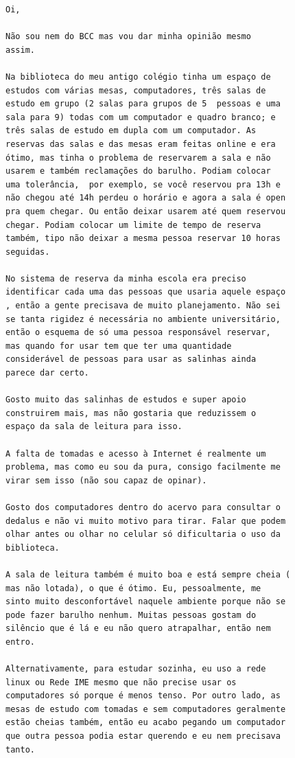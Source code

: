 \documentclass[titlepage]{article}
\begin{document}
\begin{lstlisting}[caption=Enviado por Aurea Hariki]
Oi,

Não sou nem do BCC mas vou dar minha opinião mesmo 
assim.

Na biblioteca do meu antigo colégio tinha um espaço de 
estudos com várias mesas, computadores, três salas de 
estudo em grupo (2 salas para grupos de 5  pessoas e uma 
sala para 9) todas com um computador e quadro branco; e 
três salas de estudo em dupla com um computador. As 
reservas das salas e das mesas eram feitas online e era 
ótimo, mas tinha o problema de reservarem a sala e não 
usarem e também reclamações do barulho. Podiam colocar 
uma tolerância,  por exemplo, se você reservou pra 13h e 
não chegou até 14h perdeu o horário e agora a sala é open 
pra quem chegar. Ou então deixar usarem até quem reservou 
chegar. Podiam colocar um limite de tempo de reserva 
também, tipo não deixar a mesma pessoa reservar 10 horas 
seguidas.

No sistema de reserva da minha escola era preciso 
identificar cada uma das pessoas que usaria aquele espaço
, então a gente precisava de muito planejamento. Não sei 
se tanta rigidez é necessária no ambiente universitário, 
então o esquema de só uma pessoa responsável reservar, 
mas quando for usar tem que ter uma quantidade 
considerável de pessoas para usar as salinhas ainda 
parece dar certo.

Gosto muito das salinhas de estudos e super apoio 
construirem mais, mas não gostaria que reduzissem o 
espaço da sala de leitura para isso.

A falta de tomadas e acesso à Internet é realmente um 
problema, mas como eu sou da pura, consigo facilmente me 
virar sem isso (não sou capaz de opinar).

Gosto dos computadores dentro do acervo para consultar o 
dedalus e não vi muito motivo para tirar. Falar que podem 
olhar antes ou olhar no celular só dificultaria o uso da 
biblioteca. 

A sala de leitura também é muito boa e está sempre cheia (
mas não lotada), o que é ótimo. Eu, pessoalmente, me 
sinto muito desconfortável naquele ambiente porque não se 
pode fazer barulho nenhum. Muitas pessoas gostam do 
silêncio que é lá e eu não quero atrapalhar, então nem 
entro.

Alternativamente, para estudar sozinha, eu uso a rede 
linux ou Rede IME mesmo que não precise usar os 
computadores só porque é menos tenso. Por outro lado, as 
mesas de estudo com tomadas e sem computadores geralmente 
estão cheias também, então eu acabo pegando um computador 
que outra pessoa podia estar querendo e eu nem precisava 
tanto.


\end{lstlisting}
\end{document}
